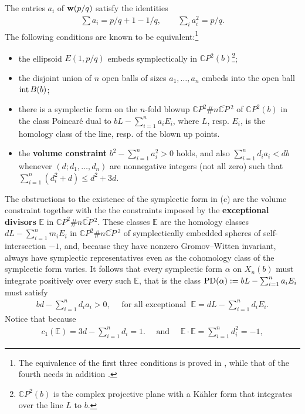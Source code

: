 \documentclass[11pt, reqno]{amsart}
\theoremstyle{remark}
\numberwithin{equation}{subsection}
\numberwithin{figure}{section}
\theoremstyle{customremark}
\newcommand{\bw}{{\bf w}}
\newcommand{\intt}{{\rm int}}
\newcommand{\bE}{{\mathbb E}}
\newcommand{\ov}{\overline}
\newcommand{\al}{{\alpha}}
\newcommand{\C}{\mathbb{C}}
\begin{document}
The entries $a_i$ of $\bw(p/q)$ satisfy the identities
\begin{align}\label{eq:wtai}
\sum a_i = p/q+1-1/q,  \qquad \sum_i a_i^2 = p/q.
\end{align}
The following conditions are known to be equivalent:\footnote
{The equivalence of the first three conditions is proved in \cite{Mell}, while that of the fourth needs in addition \cite[Prop.1.9]{Hutchq}.}
\begin{itemize}\item[{\rm (a)}]
the ellipsoid $E(1,p/q)$ embeds symplectically in $\C P^2(b)$\footnote
{ $\C P^2(b)$ is the complex projective plane with a K\"ahler form that integrates over the line $L$ to $b$.};
\item[{\rm (b)}] the disjoint union of $n$ open  balls of sizes $a_1,\dots, a_n$ embeds into the open ball $\intt\,  B(b)$;
\item[{\rm (c)}] there is a symplectic form on the $n$-fold blowup $\C P^2\# n \ov{\C P}\,\!^2$ of $\C P^2(b)$ in the class Poincar\'e dual to $bL - \sum_{i=1}^n a_i E_i$, where $L$, resp. $E_i$, is the homology class of the line, resp. of  the blown up points.
\item[{\rm (d)}] the {\bf volume constraint} $b^2  - \sum_{i=1}^n a_i^2 > 0$ holds, and also $\sum_{i=1}^n d_ia_i < db$ whenever $(d;d_1,\dots,d_n)$ are nonnegative integers (not all zero) such that 
$\sum_{i=1}^n(d_i^2+d) \le d^2 + 3d$.
\end{itemize}
The obstructions to the existence of the symplectic form in (c) are the volume constraint together with the 
 the constraints imposed by the {\bf exceptional divisors} $\bE$ in $\C P^2\# n \ov{\C P}\,\!^2$.
These classes $\bE$ are the homology classes $dL-\sum_{i=1}^n m_i E_i$ in $\C P^2\# n \ov{\C P}\,\!^2$ of symplectically  embedded spheres of self-intersection $-1$, and, because they have nonzero Gromov--Witten invariant, always   have symplectic representatives even as the cohomology class of the symplectic form varies.
It follows that every symplectic form $\al$ on $X_n(b)$ must integrate positively over every such $\bE$, that is
the class  $
{\rm PD}(\al): =b L - \sum_{i=1}^n a_i E_i$  must satisfy
\begin{align}\label{eq:constraint}
b d - {\textstyle \sum_{i=1}^n} d_i a_i > 0,\quad \mbox{ for all exceptional }\; \bE = dL-{\textstyle\sum_{i=1}^n} d_i E_i.
\end{align} 
Notice that because 
\begin{align}\label{eq:Dioph}
c_1(\bE) = 3d-\sum_{i=1}^n  d_i=1. \quad\mbox{ and } \quad \bE\cdot\bE = \sum_{i=1}^n d_i^2= -1,
\end{align}
\end{document}
